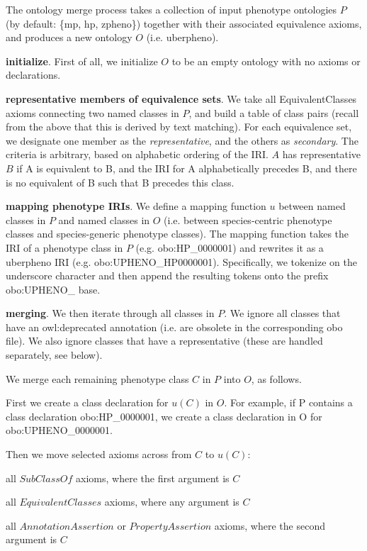 The ontology merge process takes a collection of input phenotype
ontologies $P$ (by default: \{mp, hp, zpheno\}) together with their
associated equivalence axioms, and produces a new ontology $O$
(i.e. uberpheno).

\textbf{initialize}. First of all, we initialize $O$ to be an empty
ontology with no axioms or declarations.

\textbf{representative members of equivalence sets}. We take all
EquivalentClasses axioms connecting two named classes in $P$, and
build a table of class pairs (recall from the above that this is
derived by text matching). For each equivalence set, we designate one
member as the \emph{representative}, and the others as
\emph{secondary}. The criteria is arbitrary, based on alphabetic
ordering of the IRI. $A$ has representative $B$ if A is equivalent
to B, and the IRI for A alphabetically precedes B, and there is no
equivalent of B such that B precedes this class.

\textbf{mapping phenotype IRIs}. We define a mapping function $u$
between named classes in $P$ and named classes in $O$
(i.e. between species-centric phenotype classes and species-generic
phenotype classes). The mapping function takes the IRI of a phenotype
class in $P$ (e.g. obo:HP\_0000001) and rewrites it as a uberpheno
IRI (e.g. obo:UPHENO\_HP0000001). Specifically, we tokenize on the
underscore character and then append the resulting tokens onto the
prefix obo:UPHENO_ base.


\textbf{merging}. We then iterate through all classes in $P$. We
ignore all classes that have an owl:deprecated annotation (i.e. are
obsolete in the corresponding obo file). We also ignore classes that
have a representative (these are handled separately, see below).

We merge each remaining phenotype class $C$ in $P$ into $O$, as follows.

First we create a class declaration for $u(C)$ in $O$. For example, if
P contains a class declaration obo:HP\_0000001, we create a class
declaration in O for obo:UPHENO\_0000001.

Then we move selected axioms across from $C$ to $u(C)$:

\begin{description}
\item all $SubClassOf$ axioms, where the first argument is $C$
\item all $EquivalentClasses$ axioms, where any argument is $C$
\item all $AnnotationAssertion$ or $PropertyAssertion$ axioms, where the second argument is $C$
\end{description}


